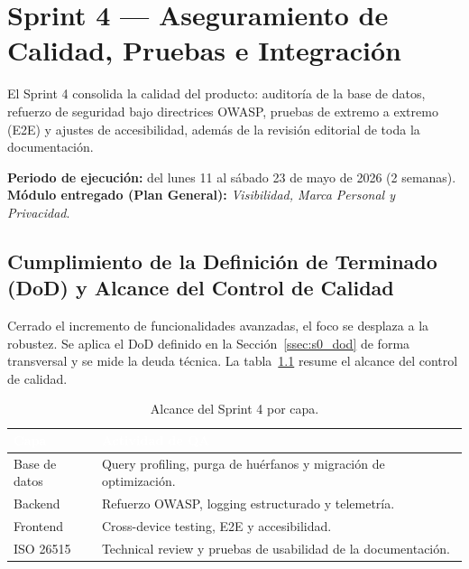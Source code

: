 \chapter{Sprint 4 — Aseguramiento de Calidad, Pruebas e Integración}
\label{cap:sprint4}

El Sprint 4 consolida la calidad del producto: auditoría de la base de datos, refuerzo de
seguridad bajo directrices OWASP, pruebas de extremo a extremo (E2E) y ajustes de
accesibilidad, además de la revisión editorial de toda la documentación.\par

\textbf{Periodo de ejecución:} del lunes 11 al sábado 23 de mayo de 2026 (2 semanas).
\textbf{Módulo entregado (Plan General):} \textit{Visibilidad, Marca Personal y Privacidad}.\par

\section{Cumplimiento de la Definición de Terminado (DoD) y Alcance del Control de Calidad}
\label{sec:s4_resumen}

Cerrado el incremento de funcionalidades avanzadas, el foco se desplaza a la robustez. Se aplica
el DoD definido en la Sección~\ref{ssec:s0_dod} de forma transversal y se mide la deuda técnica.
La tabla~\ref{tab:s4_alcance} resume el alcance del control de calidad.

\begin{table}[!ht]
    \centering
    \renewcommand{\arraystretch}{1.35}
    \fontsize{9}{10.8}\selectfont\sffamily
    \begin{tabularx}{\textwidth}{|l|X|}
        \hline
        \rowcolor{colorPrimario}
        \textcolor{white}{\textbf{Capa}} & \textcolor{white}{\textbf{Actividad de QA}} \\ \hline
        Base de datos & Query profiling, purga de huérfanos y migración de optimización. \\ \hline
        \rowcolor{grisTecnico}
        Backend & Refuerzo OWASP, logging estructurado y telemetría. \\ \hline
        Frontend & Cross-device testing, E2E y accesibilidad. \\ \hline
        \rowcolor{grisTecnico}
        ISO 26515 & Technical review y pruebas de usabilidad de la documentación. \\ \hline
    \end{tabularx}
    \caption{Alcance del Sprint 4 por capa.}
    \label{tab:s4_alcance}
\end{table}

